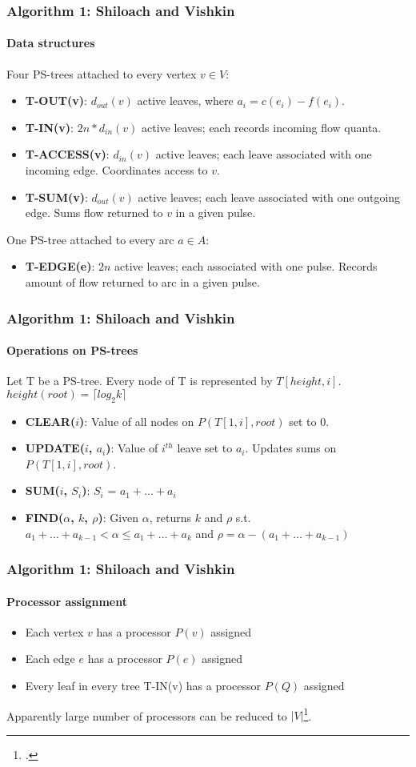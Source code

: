 \documentclass{beamer}
\begin{document}
\begin{frame}
\frametitle{Algorithm 1: Shiloach and Vishkin}
\framesubtitle{Data structures} 
Four PS-trees attached to every vertex $v\in V$:
\begin{itemize}
	\item \textbf{T-OUT(v)}: $d_{out}(v)$ active leaves, where $a_i=c(e_i)-f(e_i)$.
	\item \textbf{T-IN(v)}: $2n*d_{in}(v)$ active leaves; each records incoming flow quanta.
	\item \textbf{T-ACCESS(v)}: $d_{in}(v)$ active leaves; each leave associated with one incoming edge. Coordinates access to $v$. 
	\item \textbf{T-SUM(v)}: $d_{out}(v)$ active leaves; each leave associated with one outgoing edge. Sums flow returned to $v$ in a given pulse. 
\end{itemize}
One PS-tree attached to every arc $a\in A$:
\begin{itemize}
	\item \textbf{T-EDGE(e)}: $2n$ active leaves; each associated with one pulse. Records amount of flow returned to arc in a given pulse.
\end{itemize}
\end{frame}

\begin{frame}
\frametitle{Algorithm 1: Shiloach and Vishkin}
\framesubtitle{Operations on PS-trees}
Let T be a PS-tree. Every node of T is represented by $T[height,i]$. $height(root) = \lceil log_2 k \rceil$
\begin{itemize}
	\item \textbf{CLEAR($i$)}: Value of all nodes on $P(T[1,i],root)$ set to 0.
	\item \textbf{UPDATE($i$, $a_i$)}:  Value of $i^{th}$ leave set to $a_i$. Updates sums on $P(T[1,i],root)$.
	\item \textbf{SUM($i$, $S_i$)}: $S_i$ = $a_1+\ldots +a_i$ 
	\item \textbf{FIND($\alpha$, $k$, $\rho$)}: Given $\alpha$, returns $k$ and $\rho$ s.t.
	$a_1+\ldots +a_{k-1} < \alpha \leq a_1+\ldots +a_k$ and
	$\rho = \alpha - (a_1+\ldots +a_{k-1})$
\end{itemize}
\end{frame}

\begin{frame}
\frametitle{Algorithm 1: Shiloach and Vishkin}
\framesubtitle{Processor assignment} 
\begin{itemize}
	\item Each vertex $v$ has a processor $P(v)$ assigned
	\item Each edge $e$ has a processor $P(e)$ assigned
	\item Every leaf in every tree T-IN(v) has a processor $P(Q)$ assigned
\end{itemize}
\pause
Apparently large number of processors can be reduced to $\lvert V \rvert$\footcite{yossi81}.
\end{frame}
\end{document}
